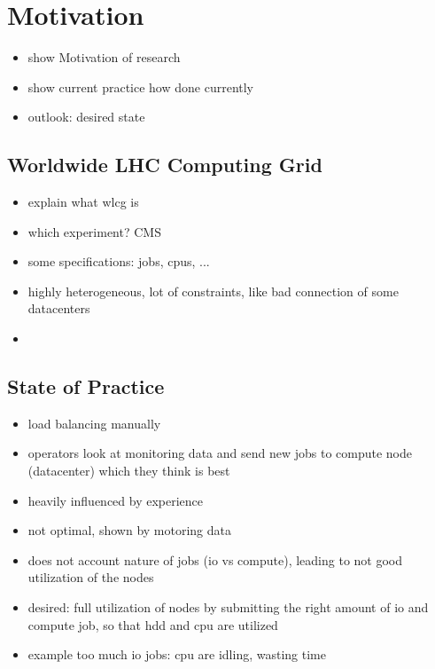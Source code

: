 
\chapter{Motivation}
\label{ch:Motivation}

\begin{itemize}
	\item show Motivation of research
	\item show current practice how done currently
	\item outlook: desired state 
\end{itemize}


\section{Worldwide LHC Computing Grid }
\label{sec:Motivation:wlcg}
\begin{itemize}
	\item explain what wlcg is
	\item which experiment? CMS
	\item some specifications: jobs, cpus, ...
	\item highly heterogeneous, lot of constraints, like bad connection of some datacenters
	\item \cite{bayatian2005cms} \cite{bonacorsi2007cms} \cite{hernandez2008cms}
\end{itemize}

\section{State of Practice}
\label{sec:Motivation:State of Practice}

\begin{itemize}
	\item load balancing manually
	\item operators look at monitoring data and send new jobs to  compute node (datacenter) which they think is best
	\item heavily influenced by experience
	\item not optimal, shown by motoring data
	\item does not account nature of jobs (io vs compute), leading to not good utilization of the nodes
	\item desired: full utilization of nodes by submitting the right amount of io and compute job, so that hdd and cpu are utilized
	\item example too much io jobs: cpu are idling, wasting time
\end{itemize}


